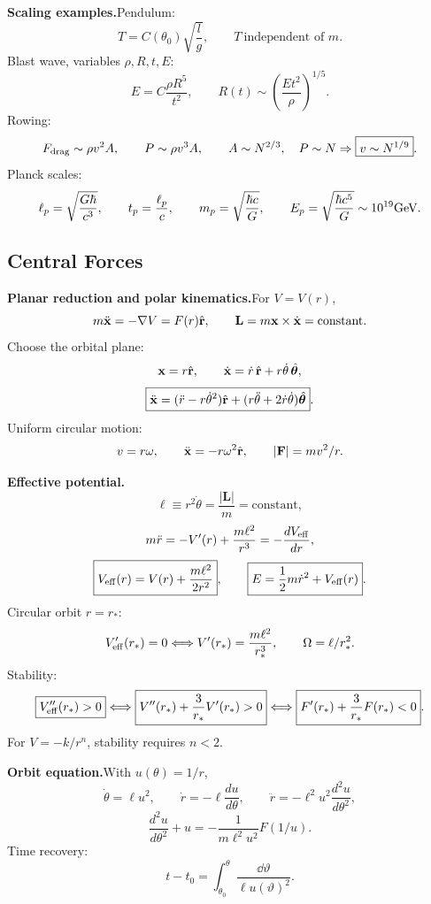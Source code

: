 \noindent\textbf{Scaling examples.}\quad Pendulum:
\[
  T=C(\theta_0)\sqrt{\frac{l}{g}},\qquad
  T\ \text{independent of }m.
\]
Blast wave, variables $\rho,R,t,E$:
\[
  \boxed{E=C\frac{\rho R^5}{t^2}},\qquad
  R(t)\sim\left(\frac{Et^2}{\rho}\right)^{1/5}.
\]
Rowing:
\[
  F_{\rm drag}\sim\rho v^2A,\qquad P\sim\rho v^3A,\qquad
  A\sim N^{2/3},\quad P\sim N
  \Rightarrow \boxed{v\sim N^{1/9}}.
\]
Planck scales:
\[
  \ell_p=\sqrt{\frac{G\hbar}{c^3}},\qquad
  t_p=\frac{\ell_p}{c},\qquad
  m_p=\sqrt{\frac{\hbar c}{G}},\qquad
  E_p=\sqrt{\frac{\hbar c^5}{G}}\sim10^{19}{\rm GeV}.
\]

\subsection{Central Forces}

\noindent\textbf{Planar reduction and polar kinematics.}\quad For $V=V(r)$,
\[
  m\ddot{\mathbf x}=-\nabla V=F(r)\hat{\mathbf r},\qquad
  \mathbf L=m\mathbf x\times\dot{\mathbf x}=\text{constant}.
\]
Choose the orbital plane:
\[
  \mathbf x=r\hat{\mathbf r},\qquad
  \dot{\mathbf x}=\dot r\,\hat{\mathbf r}+r\dot\theta\,\hat{\boldsymbol\theta},
\]
\[
  \boxed{\ddot{\mathbf x}=(\ddot r-r\dot\theta^2)\hat{\mathbf r}+
  (r\ddot\theta+2\dot r\dot\theta)\hat{\boldsymbol\theta}}.
\]
Uniform circular motion:
\[
  v=r\omega,\qquad \ddot{\mathbf x}=-r\omega^2\hat{\mathbf r},\qquad
  |\mathbf F|=mv^2/r.
\]

\noindent\textbf{Effective potential.}\quad
\[
  \ell\equiv r^2\dot\theta=\frac{|\mathbf L|}{m}=\text{constant},
\]
\[
  m\ddot r=-V'(r)+\frac{m\ell^2}{r^3}
  =-\frac{dV_{\rm eff}}{dr},
\]
\[
  \boxed{V_{\rm eff}(r)=V(r)+\frac{m\ell^2}{2r^2}},\qquad
  \boxed{E=\frac{1}{2} m\dot r^2+V_{\rm eff}(r)}.
\]
Circular orbit $r=r_\ast$:
\[
  V_{\rm eff}'(r_\ast)=0
  \Longleftrightarrow
  V'(r_\ast)=\frac{m\ell^2}{r_\ast^3},\qquad
  \Omega=\ell/r_\ast^2.
\]
Stability:
\[
  \boxed{V_{\rm eff}''(r_\ast)>0}
  \Longleftrightarrow
  \boxed{V''(r_\ast)+\frac{3}{r_\ast}V'(r_\ast)>0}
  \Longleftrightarrow
  \boxed{F'(r_\ast)+\frac{3}{r_\ast}F(r_\ast)<0}.
\]
For $V=-k/r^n$, stability requires $n<2$. 

\noindent\textbf{Orbit equation.}\quad With $u(\theta)=1/r$,
\[
  \dot\theta=\ell u^2,\qquad
  \dot r=-\ell\frac{du}{d\theta},\qquad
  \ddot r=-\ell^2u^2\frac{d^2u}{d\theta^2},
\]
\[
  \boxed{\frac{d^2u}{d\theta^2}+u
  =-\frac{1}{m\ell^2u^2}F(1/u)}.
\]
Time recovery:
\[
  t-t_0=\int_{\theta_0}^{\theta}\frac{\dd\vartheta}{\ell u(\vartheta)^2}.
\]

